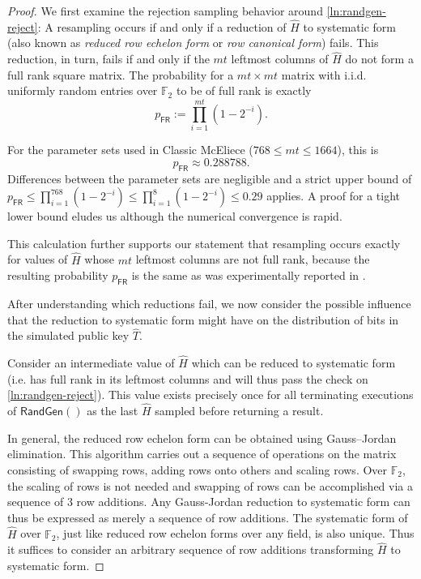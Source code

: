 \begin{proof}
    We first examine the rejection sampling behavior around \cref{ln:randgen-reject}: A resampling occurs if and only if a reduction of $\hat H$ to systematic form (also known as \emph{reduced row echelon form} or \emph{row canonical form}) fails. This reduction, in turn, fails if and only if the $mt$ leftmost columns of $\hat H$ do not form a full rank square matrix.
    The probability for a $mt \times mt$ matrix with i.i.d. uniformly random entries over $\mathbb F_2$ to be of full rank is exactly~\cite{DBLP:journals/corr/SalmondGGC14}
    \[ p_\mathsf{FR} := \prod_{i=1}^{mt} \left( 1-2^{-i} \right). \]
    
    For the parameter sets used in Classic McEliece ($768 \leq mt \leq 1664$), this is \[ p_\mathsf{FR} \approx 0.288788 . \]
    Differences between the parameter sets are negligible and a strict upper bound of $p_\mathsf{FR} \leq \prod_{i=1}^{768} \left( 1-2^{-i} \right) \leq \prod_{i=1}^{8} \left( 1-2^{-i} \right) \leq 0.29$ applies. A proof for a tight lower bound eludes us although the numerical convergence is rapid.
    
    This calculation further supports our statement that resampling occurs exactly for values of $\hat H$ whose $mt$ leftmost columns are not full rank, because the resulting probability $p_\mathsf{FR}$ is the same as was experimentally reported in \cite[security.pdf: Section 4.2]{NISTPQC-R4:ClassicMcEliece22}.
    
    After understanding which reductions fail, we now consider the possible influence that the reduction to systematic form might have on the distribution of bits in the simulated public key $\hat T$.

    Consider an intermediate value of $\hat H$ which can be reduced to systematic form (i.e. has full rank in its leftmost columns and will thus pass the check on \cref{ln:randgen-reject}). This value exists precisely once for all terminating executions of $\mathsf{RandGen}()$ as the last $\hat H$ sampled before returning a result.

    In general, the reduced row echelon form can be obtained using Gauss–Jordan elimination. This algorithm carries out a sequence of operations on the matrix consisting of swapping rows, adding rows onto others and scaling rows.
    Over $\mathbb F_2$, the scaling of rows is not needed and swapping of rows can be accomplished via a sequence of 3 row additions. Any Gauss-Jordan reduction to systematic form can thus be expressed as merely a sequence of row additions.
    The systematic form of $\hat H$ over $\mathbb F_2$, just like reduced row echelon forms over any field, is also unique. Thus it suffices to consider an arbitrary sequence of row additions transforming $\hat H$ to systematic form.


\end{proof}
